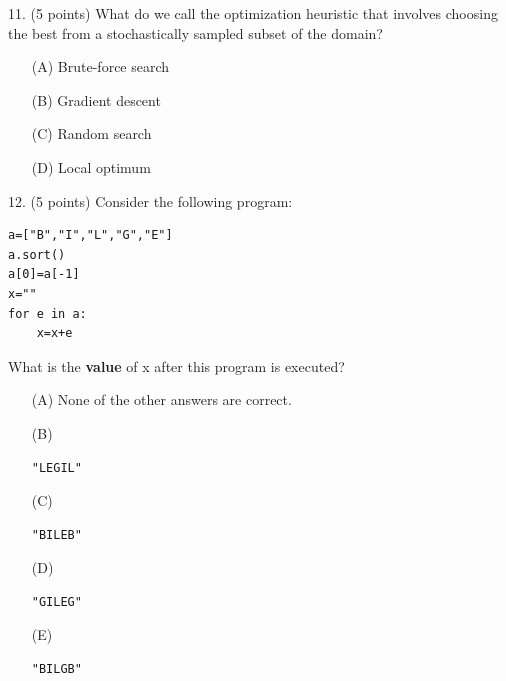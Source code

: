 \documentclass{article}
\begin{document}
\noindent
\begin{minipage}{\textwidth}
11. (5 points)
What do we call the optimization heuristic that involves choosing the best from a stochastically sampled subset of the domain?

\begin{enumerate}
\item[(A)]
Brute-force search

\item[(B)]
Gradient descent

\item[(C)]
Random search

\item[(D)]
Local optimum

\end{enumerate}
\end{minipage}
\vspace{10em}
\filbreak\vfil{}\vfilneg

\noindent
\begin{minipage}{\textwidth}
12. (5 points)
Consider the following program:
\begin{verbatim}
a=["B","I","L","G","E"]
a.sort()
a[0]=a[-1]
x=""
for e in a:
    x=x+e
\end{verbatim}
What is the \textbf{value} of x after this program is executed?

\begin{enumerate}
\item[(A)]
None of the other answers are correct.

\item[(B)]
\begin{verbatim}"LEGIL"\end{verbatim}

\item[(C)]
\begin{verbatim}"BILEB"\end{verbatim}

\item[(D)]
\begin{verbatim}"GILEG"\end{verbatim}

\item[(E)]
\begin{verbatim}"BILGB"\end{verbatim}

\end{enumerate}
\end{minipage}
\vspace{10em}
\filbreak\vfil{}\vfilneg
\end{document}

